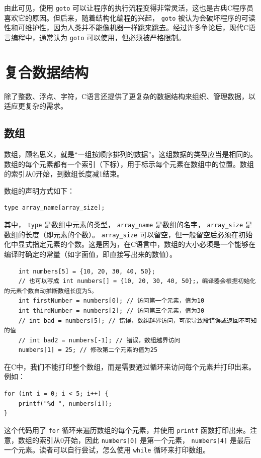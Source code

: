 由此可见，使用 \verb|goto| 可以让程序的执行流程变得非常灵活，这也是古典C程序员喜欢它的原因。但后来，随着结构化编程的兴起， \verb|goto| 被认为会破坏程序的可读性和可维护性，因为人类并不能像机器一样跳来跳去。经过许多争论后，现代C语言编程中，通常认为 \verb|goto| 可以使用，但必须被严格限制。

\section{复合数据结构}

除了整数、浮点、字符，C语言还提供了更复杂的数据结构来组织、管理数据，以适应更复杂的需求。

\subsection{数组} 数组，顾名思义，就是“一组按顺序排列的数据”。这组数据的类型应当是相同的。数组的每个元素都有一个索引（下标），用于标示每个元素在数组中的位置。数组的索引从0开始，到数组长度减1结束。

数组的声明方式如下：
\begin{verbatim}
type array_name[array_size];
\end{verbatim}
其中， \verb|type| 是数组中元素的类型， \verb|array_name| 是数组的名字， \verb|array_size| 是数组的长度（即元素的个数）。 \verb|array_size| 可以留空，但一般留空后必须在初始化中显式指定元素的个数。这是因为，在C语言中，数组的大小必须是一个能够在编译时确定的常量（如字面值，即直接写出来的数值）。

\begin{verbatim}
    int numbers[5] = {10, 20, 30, 40, 50};
    // 也可以写成 int numbers[] = {10, 20, 30, 40, 50};，编译器会根据初始化的元素个数自动推断数组长度为5。
    int firstNumber = numbers[0]; // 访问第一个元素，值为10
    int thirdNumber = numbers[2]; // 访问第三个元素，值为30
    // int bad = numbers[5]; // 错误，数组越界访问，可能导致段错误或返回不可知的值
    // int bad2 = numbers[-1]; // 错误，数组越界访问
    numbers[1] = 25; // 修改第二个元素的值为25
\end{verbatim}

在C中，我们不能打印整个数组，而是需要通过循环来访问每个元素并打印出来。例如：
\begin{verbatim}
for (int i = 0; i < 5; i++) {
    printf("%d ", numbers[i]);
}
\end{verbatim}
这个代码用了 \verb|for| 循环来遍历数组的每个元素，并使用 \verb|printf| 函数打印出来。注意，数组的索引从0开始，因此 \verb|numbers[0]| 是第一个元素， \verb|numbers[4]| 是最后一个元素。读者可以自行尝试，怎么使用 \verb|while| 循环来打印数组。

